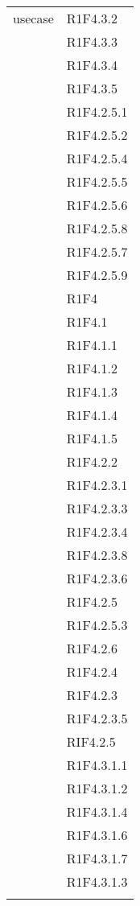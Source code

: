 \begin{center}
\begin{longtable}{|p{7cm}|p{5cm}|}
		usecase & R1F4.3.2 \\ & R1F4.3.3 \\ & R1F4.3.4 \\ & R1F4.3.5 \\ & R1F4.2.5.1 \\ & R1F4.2.5.2 \\ & R1F4.2.5.4 \\ & R1F4.2.5.5 \\ & R1F4.2.5.6 \\ & R1F4.2.5.8 \\ & R1F4.2.5.7 \\ & R1F4.2.5.9 \\ & R1F4 \\ & R1F4.1 \\ & R1F4.1.1 \\ & R1F4.1.2 \\ & R1F4.1.3 \\ & R1F4.1.4 \\ & R1F4.1.5 \\ & R1F4.2.2 \\ & R1F4.2.3.1 \\ & R1F4.2.3.3 \\ & R1F4.2.3.4 \\ & R1F4.2.3.8 \\ & R1F4.2.3.6 \\ & R1F4.2.5 \\ & R1F4.2.5.3 \\ & R1F4.2.6 \\ & R1F4.2.4 \\ & R1F4.2.3 \\ & R1F4.2.3.5 \\ & RIF4.2.5 \\ & R1F4.3.1.1 \\ & R1F4.3.1.2 \\ & R1F4.3.1.4 \\ & R1F4.3.1.6 \\ & R1F4.3.1.7 \\ & R1F4.3.1.3 \\ & \\ \hline
	\end{longtable}
\end{center}
